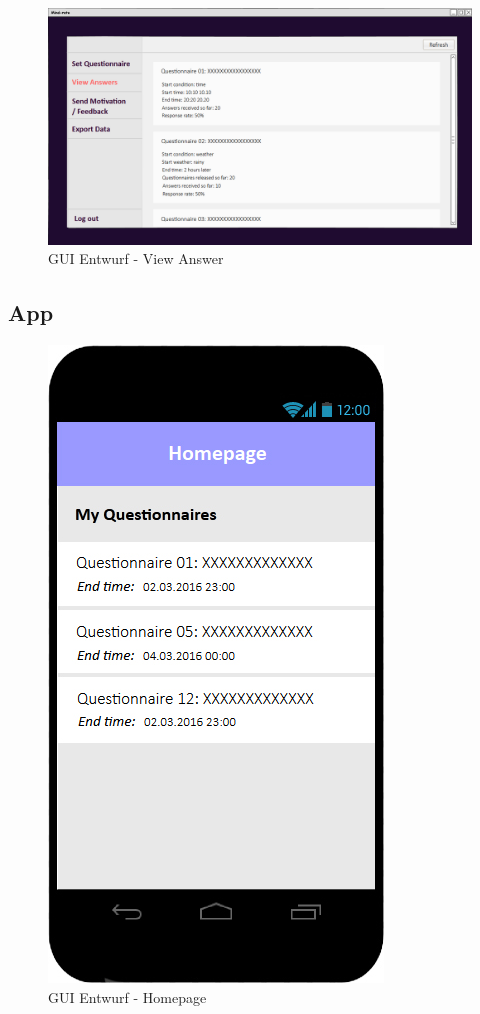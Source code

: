 \documentclass[a4paper]{scrreprt}
\begin{document}
                \begin{figure}[ht]
                    \centering
                    \includegraphics[scale = 0.25]{web_answer.png}
                    \caption{GUI Entwurf - View Answer}
                \end{figure}

            \newpage
            \subsection{App}
                \vspace*{2cm}

                \begin{figure}[ht]
                    \centering
                    \includegraphics[scale = 0.3]{android_home.jpg}
                    \caption{GUI Entwurf - Homepage}
                \end{figure}
\end{document}
